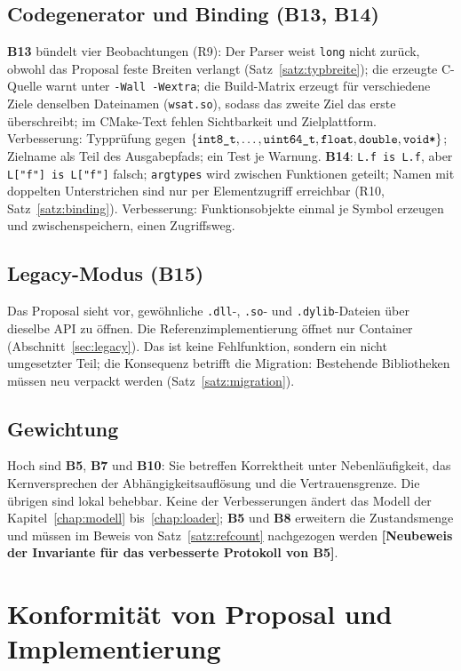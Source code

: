 \documentclass[a4paper,12pt,twoside]{report}
\DeclareRobustCommand{\_}{\ifmmode\mbox{\textunderscore}\else\textunderscore\allowbreak{}\fi}
\theoremstyle{definition}
\newcommand{\offen}[1]{\textcolor{accentred}{\textbf{[#1]}}}
\newcommand{\Bf}[1]{\textbf{B#1}}
\begin{document}
\section{Codegenerator und Binding (\Bf{13}, \Bf{14})}
\Bf{13} bündelt vier Beobachtungen (R9): Der Parser weist \texttt{long} nicht zurück, obwohl das Proposal feste Breiten verlangt (Satz~\ref{satz:typbreite}); die erzeugte C-Quelle warnt unter \texttt{-Wall -Wextra}; die Build-Matrix erzeugt für verschiedene Ziele denselben Dateinamen (\texttt{wsat.so}), sodass das zweite Ziel das erste überschreibt; im CMake-Text fehlen Sichtbarkeit und Zielplattform. Verbesserung: Typprüfung gegen $\{\texttt{int8\_t},\dots,\texttt{uint64\_t},\texttt{float},\texttt{double},\texttt{void*}\}$; Zielname als Teil des Ausgabepfads; ein Test je Warnung. \Bf{14}: \texttt{L.f is L.f}, aber \texttt{L["f"] is L["f"]} falsch; \texttt{argtypes} wird zwischen Funktionen geteilt; Namen mit doppelten Unterstrichen sind nur per Elementzugriff erreichbar (R10, Satz~\ref{satz:binding}). Verbesserung: Funktionsobjekte einmal je Symbol erzeugen und zwischenspeichern, einen Zugriffsweg.

\section{Legacy-Modus (\Bf{15})}
Das Proposal sieht vor, gewöhnliche \texttt{.dll}-, \texttt{.so}- und \texttt{.dylib}-Dateien über dieselbe API zu öffnen. Die Referenzimplementierung öffnet nur Container (Abschnitt~\ref{sec:legacy}). Das ist keine Fehlfunktion, sondern ein nicht umgesetzter Teil; die Konsequenz betrifft die Migration: Bestehende Bibliotheken müssen neu verpackt werden (Satz~\ref{satz:migration}).

\section{Gewichtung}
Hoch sind \Bf{5}, \Bf{7} und \Bf{10}: Sie betreffen Korrektheit unter Nebenläufigkeit, das Kernversprechen der Abhängigkeitsauflösung und die Vertrauensgrenze. Die übrigen sind lokal behebbar. Keine der Verbesserungen ändert das Modell der Kapitel~\ref{chap:modell} bis~\ref{chap:loader}; \Bf{5} und \Bf{8} erweitern die Zustandsmenge und müssen im Beweis von Satz~\ref{satz:refcount} nachgezogen werden \offen{Neubeweis der Invariante für das verbesserte Protokoll von \Bf{5}}.


\chapter{Konformität von Proposal und Implementierung}
\label{chap:konformitaet}
\end{document}
